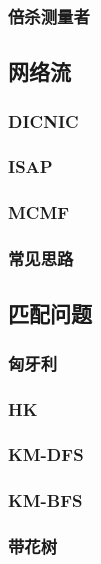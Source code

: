 \documentclass[10pt,a4paper]{article}
\begin{document}
\subsubsection{倍杀测量者}

\subsection{网络流}
\subsubsection{DICNIC}

\subsubsection{ISAP}

\subsubsection{MCMF}

\subsubsection{常见思路}

\subsection{匹配问题}
\subsubsection{匈牙利}

\subsubsection{HK}

\subsubsection{KM-DFS}

\subsubsection{KM-BFS}

\subsubsection{带花树}

\end{document}
